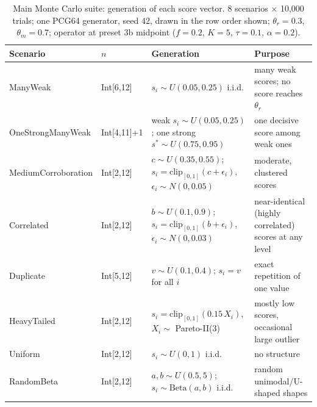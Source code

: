 \begin{table}[!t]
\caption{Main Monte Carlo suite: generation of each score vector. 8 scenarios $\times$ 10,000 trials;
one PCG64 generator, seed 42, drawn in the row order shown; $\theta_r=0.3$, $\theta_m=0.7$;
operator at preset 3b midpoint ($f=0.2$, $K=5$, $\tau=0.1$, $\alpha=0.2$).}
\label{tab:mc-main-spec}
\centering\footnotesize
\begin{tabular}{@{}llp{6.8cm}p{4.6cm}@{}}
\toprule
\textbf{Scenario} & \textbf{$n$} & \textbf{Generation} & \textbf{Purpose} \\
\midrule
ManyWeak & Int[6,12] & $s_i\sim U(0.05,0.25)$ i.i.d. & many weak scores; no score reaches $\theta_r$ \\
OneStrongManyWeak & Int[4,11]+1 & weak $s_i\sim U(0.05,0.25)$; one strong $s^*\sim U(0.75,0.95)$ & one decisive score among weak ones \\
MediumCorroboration & Int[2,12] & $c\sim U(0.35,0.55)$; $s_i=\mathrm{clip}_{[0,1]}(c+\epsilon_i)$, $\epsilon_i\sim N(0,0.05)$ & moderate, clustered scores \\
Correlated & Int[2,12] & $b\sim U(0.1,0.9)$; $s_i=\mathrm{clip}_{[0,1]}(b+\epsilon_i)$, $\epsilon_i\sim N(0,0.03)$ & near-identical (highly correlated) scores at any level \\
Duplicate & Int[5,12] & $v\sim U(0.1,0.4)$; $s_i=v$ for all $i$ & exact repetition of one value \\
HeavyTailed & Int[2,12] & $s_i=\mathrm{clip}_{[0,1]}(0.15\,X_i)$, $X_i\sim$ Pareto-II(3) & mostly low scores, occasional large outlier \\
Uniform & Int[2,12] & $s_i\sim U(0,1)$ i.i.d. & no structure \\
RandomBeta & Int[2,12] & $a,b\sim U(0.5,5)$; $s_i\sim \mathrm{Beta}(a,b)$ i.i.d. & random unimodal/U-shaped shapes \\
\bottomrule
\end{tabular}
\end{table}
